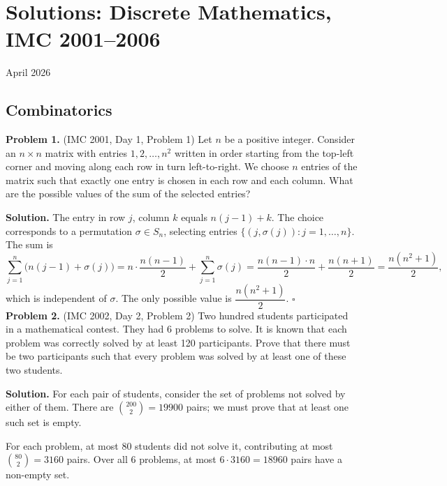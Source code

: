 \documentclass{article}
\begin{document}
\pagestyle{plain}

\section*{Solutions: Discrete Mathematics, IMC 2001--2006}

\begin{center}
April 2026
\end{center}

\subsection*{Combinatorics}

\textbf{Problem 1.} (IMC 2001, Day 1, Problem 1)
Let \( n \) be a positive integer. Consider an \( n \times n \) matrix with entries \( 1, 2, \ldots, n^2 \) written in order starting from the top-left corner and moving along each row in turn left-to-right. We choose \( n \) entries of the matrix such that exactly one entry is chosen in each row and each column. What are the possible values of the sum of the selected entries?

\textbf{Solution.}
The entry in row \( j \), column \( k \) equals \( n(j-1) + k \). The choice corresponds to a permutation \( \sigma \in S_n \), selecting entries \( \{(j, \sigma(j)) : j = 1, \ldots, n\} \). The sum is
\[
\sum_{j=1}^{n} \bigl(n(j-1) + \sigma(j)\bigr) = n \cdot \frac{n(n-1)}{2} + \sum_{j=1}^{n} \sigma(j) = \frac{n(n-1) \cdot n}{2} + \frac{n(n+1)}{2} = \frac{n(n^2+1)}{2},
\]
which is independent of \( \sigma \). The only possible value is \( \dfrac{n(n^2+1)}{2} \). \hfill\(\square\)
\\

\textbf{Problem 2.} (IMC 2002, Day 2, Problem 2)
Two hundred students participated in a mathematical contest. They had 6 problems to solve. It is known that each problem was correctly solved by at least 120 participants. Prove that there must be two participants such that every problem was solved by at least one of these two students.

\textbf{Solution.}
For each pair of students, consider the set of problems not solved by either of them. There are \( \binom{200}{2} = 19900 \) pairs; we must prove that at least one such set is empty.

For each problem, at most 80 students did not solve it, contributing at most \( \binom{80}{2} = 3160 \) pairs. Over all 6 problems, at most \( 6 \cdot 3160 = 18960 \) pairs have a non-empty set.
\end{document}
